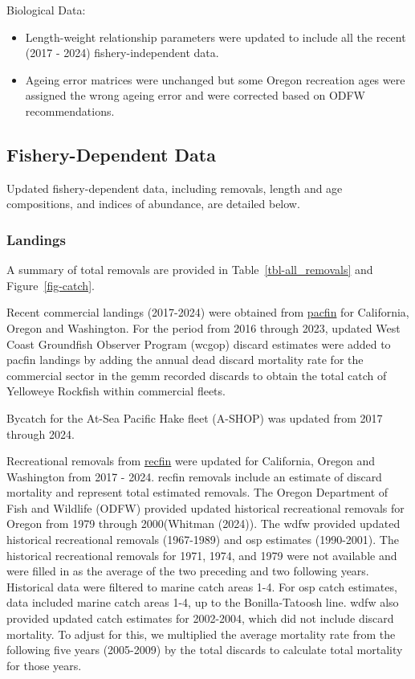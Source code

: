 \documentclass[
]{scrartcl}
\providecommand{\tightlist}{%
  \setlength{\itemsep}{0pt}\setlength{\parskip}{0pt}}\usepackage{longtable,booktabs,array}
\begin{document}
Biological Data:

\begin{itemize}
\tightlist
\item
  Length-weight relationship parameters were updated to include all the
  recent (2017 - 2024) fishery-independent data.
\item
  Ageing error matrices were unchanged but some Oregon recreation ages
  were assigned the wrong ageing error and were corrected based on ODFW
  recommendations.
\end{itemize}

\subsection{Fishery-Dependent Data}\label{fishery-dependent-data}

Updated fishery-dependent data, including removals, length and age
compositions, and indices of abundance, are detailed below.

\subsubsection{Landings}\label{landings}

A summary of total removals are provided in Table~\ref{tbl-all_removals}
and Figure~\ref{fig-catch}.

Recent commercial landings (2017-2024) were obtained from
\href{www.pacfin.psmfc.org}{\gls{pacfin}} for California, Oregon and
Washington. For the period from 2016 through 2023, updated West Coast
Groundfish Observer Program (\gls{wcgop}) discard estimates were added
to \gls{pacfin} landings by adding the annual dead discard mortality
rate for the commercial sector in the \gls{gemm} recorded discards to
obtain the total catch of Yelloweye Rockfish within commercial fleets.

Bycatch for the At-Sea Pacific Hake fleet (A-SHOP) was updated from 2017
through 2024.

Recreational removals from \href{www.recfin.org}{\gls{recfin}} were
updated for California, Oregon and Washington from 2017 - 2024.
\gls{recfin} removals include an estimate of discard mortality and
represent total estimated removals. The Oregon Department of Fish and
Wildlife (ODFW) provided updated historical recreational removals for
Oregon from 1979 through 2000(Whitman (2024)). The \gls{wdfw} provided
updated historical recreational removals (1967-1989) and \gls{osp}
estimates (1990-2001). The historical recreational removals for 1971,
1974, and 1979 were not available and were filled in as the average of
the two preceding and two following years. Historical data were filtered
to marine catch areas 1-4. For \gls{osp} catch estimates, data included
marine catch areas 1-4, up to the Bonilla-Tatoosh line. \gls{wdfw} also
provided updated catch estimates for 2002-2004, which did not include
discard mortality. To adjust for this, we multiplied the average
mortality rate from the following five years (2005-2009) by the total
discards to calculate total mortality for those years.
\end{document}
